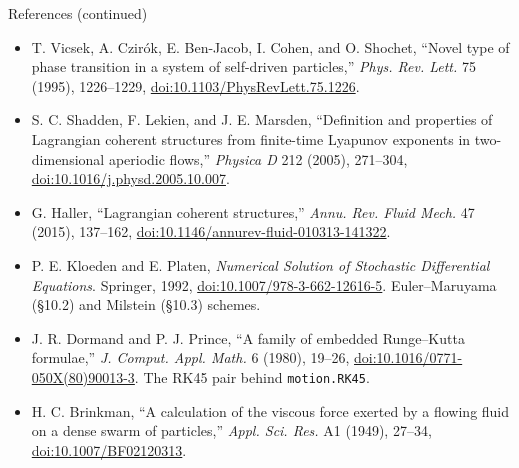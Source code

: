 \documentclass[aspectratio=169,11pt]{beamer}
\begin{document}
\begin{frame}{References (continued)}
\footnotesize
\begin{itemize}\itemsep3pt
  \item T. Vicsek, A. Czir\'ok, E. Ben-Jacob, I. Cohen, and O. Shochet, ``Novel type of phase transition in a system of self-driven particles,'' \emph{Phys. Rev. Lett.} 75 (1995), 1226--1229, \href{https://doi.org/10.1103/PhysRevLett.75.1226}{doi:10.1103/PhysRevLett.75.1226}.
  \item S. C. Shadden, F. Lekien, and J. E. Marsden, ``Definition and properties of Lagrangian coherent structures from finite-time Lyapunov exponents in two-dimensional aperiodic flows,'' \emph{Physica D} 212 (2005), 271--304, \href{https://doi.org/10.1016/j.physd.2005.10.007}{doi:10.1016/j.physd.2005.10.007}.
  \item G. Haller, ``Lagrangian coherent structures,'' \emph{Annu. Rev. Fluid Mech.} 47 (2015), 137--162, \href{https://doi.org/10.1146/annurev-fluid-010313-141322}{doi:10.1146/annurev-fluid-010313-141322}.
  \item P. E. Kloeden and E. Platen, \emph{Numerical Solution of Stochastic Differential Equations}. Springer, 1992, \href{https://doi.org/10.1007/978-3-662-12616-5}{doi:10.1007/978-3-662-12616-5}. Euler--Maruyama (\S10.2) and Milstein (\S10.3) schemes.
  \item J. R. Dormand and P. J. Prince, ``A family of embedded Runge--Kutta formulae,'' \emph{J. Comput. Appl. Math.} 6 (1980), 19--26, \href{https://doi.org/10.1016/0771-050X(80)90013-3}{doi:10.1016/0771-050X(80)90013-3}. The RK45 pair behind \texttt{motion.RK45}.
  \item H. C. Brinkman, ``A calculation of the viscous force exerted by a flowing fluid on a dense swarm of particles,'' \emph{Appl. Sci. Res.} A1 (1949), 27--34, \href{https://doi.org/10.1007/BF02120313}{doi:10.1007/BF02120313}.
\end{itemize}
\end{frame}
\end{document}
